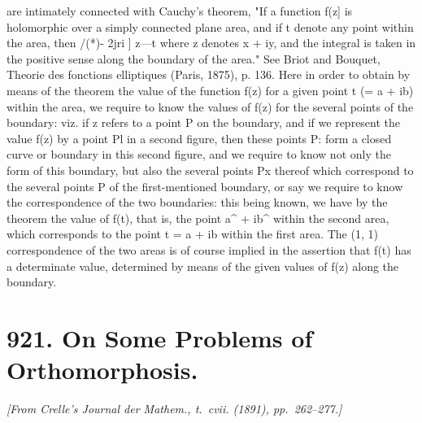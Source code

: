 \documentclass[11pt,a4paper]{book}
\begin{document}
{{{{are   intimately   connected   with    Cauchy's   theorem,   "If   a    function   f(z]    is    holomorphic
over  a  simply  connected  plane  area,  and  if  t  denote  any  point  within  the  area,  then
/(*)-
2jri  ]  z---t
where  z  denotes  x  +  iy,  and  the  integral  is  taken  in  the  positive  sense  along  the
boundary  of  the  area."  See  Briot  and  Bouquet,  Theorie  des  fonctions  elliptiques  (Paris,
1875),  p.  136.
Here  in  order  to  obtain  by  means  of  the  theorem  the  value  of  the  function
f(z)  for  a  given  point  t  (=  a  +  ib)  within  the  area,  we  require  to  know  the  values  of
f(z)  for  the  several  points  of  the  boundary:  viz.  if  z  refers  to  a  point  P  on  the
boundary,  and  if  we  represent  the  value  f(z)  by  a  point  Pl  in  a  second  figure,  then
these  points  P:  form  a  closed  curve  or  boundary  in  this  second  figure,  and  we  require
to  know  not  only  the  form  of  this  boundary,  but  also  the  several  points  Px  thereof
which  correspond  to  the  several  points  P  of  the  first-mentioned  boundary,  or  say  we
require  to  know  the  correspondence  of  the  two  boundaries:  this  being  known,  we
have  by  the  theorem  the  value  of  f(t),  that  is,  the  point  a^  +  ib^  within  the  second
area,  which  corresponds  to  the  point  t  =  a  +  ib  within  the  first  area.  The  (1,  1)
correspondence  of  the  two  areas  is  of  course  implied  in  the  assertion  that  f(t)  has
a  determinate  value,  determined  by  means  of  the  given  values  of  f(z)  along  the
boundary.



\newpage
\section*{921. On Some Problems of Orthomorphosis.}
\textit{[From Crelle's Journal der Mathem., t.~cvii. (1891), pp.~262--277.]}

}}}}
\end{document}
